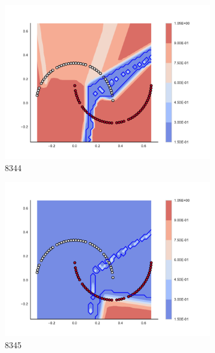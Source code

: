 \begin{figure}[h]
\begin{subfigure}[b]{0.09\textwidth}
    \includegraphics[clip, trim=2.35cm 1.75cm 4.5cm 0cm,width=\textwidth]{img/convergence/8344.pdf}
    \caption{8344}
    \label{fig:convergence_8344}
\end{subfigure}
%
\begin{subfigure}[b]{0.09\textwidth}
    \includegraphics[clip, trim=2.35cm 1.75cm 4.5cm 0cm,width=\textwidth]{img/convergence/8345.pdf}
    \caption{8345}
    \label{fig:convergence_8345}
\end{subfigure}
%
\begin{subfigure}[b]{0.09\textwidth}

\end{subfigure}
\end{figure}
